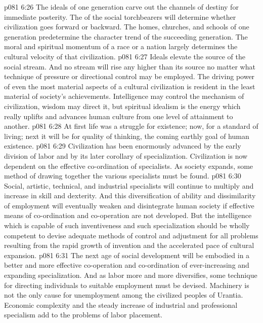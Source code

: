 \pc \vs p081 6:26 \bibnobreakspace {} The ideals of one generation carve out the channels of destiny for immediate posterity. The  of the social torchbearers will determine whether civilization goes forward or backward. The homes, churches, and schools of one generation predetermine the character trend of the succeeding generation. The moral and spiritual momentum of a race or a nation largely determines the cultural velocity of that civilization.
\vs p081 6:27 Ideals elevate the source of the social stream. And no stream will rise any higher than its source no matter what technique of pressure or directional control may be employed. The driving power of even the most material aspects of a cultural civilization is resident in the least material of society’s achievements. Intelligence may control the mechanism of civilization, wisdom may direct it, but spiritual idealism is the energy which really uplifts and advances human culture from one level of attainment to another.
\vs p081 6:28 At first life was a struggle for existence; now, for a standard of living; next it will be for quality of thinking, the coming earthly goal of human existence.
\pc \vs p081 6:29 \bibnobreakspace {} Civilization has been enormously advanced by the early division of labor and by its later corollary of specialization. Civilization is now dependent on the effective co\hyp{}ordination of specialists. As society expands, some method of drawing together the various specialists must be found.
\vs p081 6:30 Social, artistic, technical, and industrial specialists will continue to multiply and increase in skill and dexterity. And this diversification of ability and dissimilarity of employment will eventually weaken and disintegrate human society if effective means of co\hyp{}ordination and co\hyp{}operation are not developed. But the intelligence which is capable of such inventiveness and such specialization should be wholly competent to devise adequate methods of control and adjustment for all problems resulting from the rapid growth of invention and the accelerated pace of cultural expansion.
\pc \vs p081 6:31 \bibnobreakspace {} The next age of social development will be embodied in a better and more effective co\hyp{}operation and co\hyp{}ordination of ever\hyp{}increasing and expanding specialization. And as labor more and more diversifies, some technique for directing individuals to suitable employment must be devised. Machinery is not the only cause for unemployment among the civilized peoples of Urantia. Economic complexity and the steady increase of industrial and professional specialism add to the problems of labor placement.
